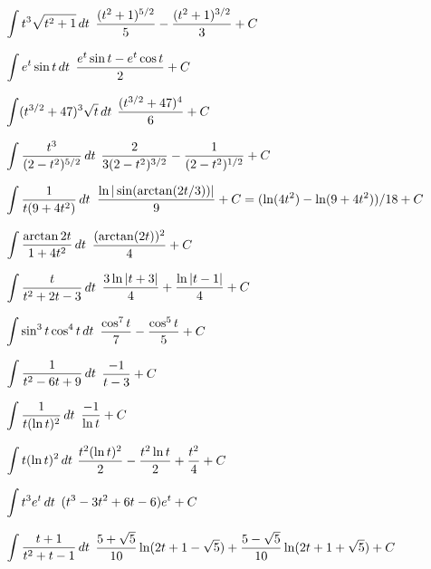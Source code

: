 \exercise $\displaystyle\int t^3\sqrt{t^2+1}\,dt$
\answer $\displaystyle{(t^2+1)^{5/2}\over 5}-{(t^2+1)^{3/2}\over 3}+C$
\endanswer
\endexercise

\exercise $\displaystyle\int e^t\sin t\,dt$
\answer $\displaystyle{e^t\sin t-e^t\cos t\over 2}+C$
\endanswer
\endexercise

\exercise $\displaystyle\int (t^{3/2}+47)^3\sqrt{t}\,dt$
\answer $\displaystyle{(t^{3/2}+47)^4\over6}+C$
\endanswer
\endexercise

\exercise $\displaystyle\int {t^3\over (2-t^2)^{5/2}}\,dt$
\answer $\displaystyle{2\over 3(2-t^2)^{3/2}}-{1\over(2-t^2)^{1/2}}+C$
\endanswer
\endexercise

\exercise $\displaystyle\int {1\over t(9+4t^2)}\,dt$
\answer $\displaystyle{\ln|\sin(\arctan(2t/3))|\over9}+C = 
(\ln(4t^2)-\ln(9+4t^2))/18 + C$
\endanswer
\endexercise

\exercise $\displaystyle\int {\arctan 2t\over 1+4t^2}\,dt$
\answer $\displaystyle{(\arctan(2t))^2\over4}+C$
\endanswer
\endexercise

\exercise $\displaystyle\int {t\over t^2+2t-3}\,dt$
\answer $\displaystyle{3\ln|t+3|\over 4}+{\ln|t-1|\over4}+C$
\endanswer
\endexercise

\exercise $\displaystyle\int \sin^3 t\cos^4 t\,dt$
\answer $\displaystyle{\cos^7 t\over 7}-{\cos^5 t\over 5}+C$
\endanswer
\endexercise

\exercise $\displaystyle\int {1\over t^2-6t+9}\,dt$
\answer $\displaystyle{-1\over t-3}+C$
\endanswer
\endexercise

\exercise $\displaystyle\int {1\over t(\ln t)^2}\,dt$
\answer $\displaystyle{-1\over \ln t}+C$
\endanswer
\endexercise

\exercise $\displaystyle\int t(\ln t)^2\,dt$
\answer $\displaystyle{t^2(\ln t)^2\over 2}-{t^2\ln t\over 2}+{t^2\over4}+C$
\endanswer
\endexercise

\exercise $\displaystyle\int t^3e^{t}\,dt$
\answer $\displaystyle(t^3-3t^2+6t-6)e^t+C$
\endanswer
\endexercise

\exercise $\displaystyle\int {t+1\over t^2+t-1}\,dt$
\answer $\displaystyle{5+\sqrt5\over10}
\ln(2t+1-\sqrt5)+{5-\sqrt5\over10}\ln(2t+1+\sqrt5)+C$
\endanswer
\endexercise

\endtwocol

\endexercises
